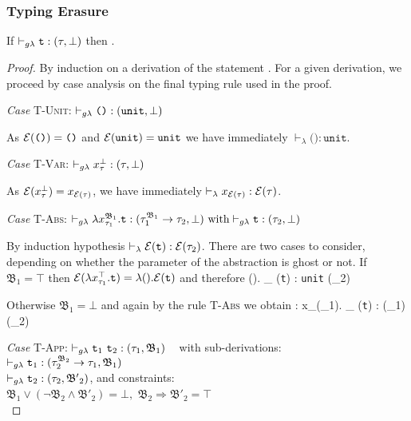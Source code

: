 \subsubsection{Typing Erasure}
\begin{lemma}
	If  $\vdash_{g\lambda} \texttt{t} : (\tau, \bot)$  
	then .
\end{lemma}
\begin{proof}
By induction on a derivation of the statement 
. 
For a given derivation, we proceed by case analysis on the final typing rule
 used in the proof. 
 
 	\noindent\textit{Case} \textsc{T-Unit}:\quad 
 	$\vdash_{g\lambda} \texttt{()} : (\texttt{unit}, \bot)$ 
 	
 		As  $\mathcal{E}(\texttt{()}) = \texttt{()}$ and $ \mathcal{E}(\texttt{unit}) = \texttt{unit}$
 		 we have immediately $\vdash_{\lambda} \texttt{()} : \texttt{unit}$.
 	
 	\noindent\textit{Case} \textsc{T-Var}:\quad 
 	$\vdash_{g\lambda} x_{\tau}^{\bot} : (\tau, \bot)$
 	 
 	 As  $\mathcal{E}(x_{\tau}^{\bot}) = x_{\mathcal{E}(\tau)}$, we have immediately 
 	 $\vdash_{\lambda} x_{\mathcal{E}(\tau)} : \mathcal{E}(\tau)$.
 	 

 	\textit{Case} \textsc{T-Abs}:\quad
 		$\vdash_{g\lambda} \lambda x_{\tau_{1}}^{\mathfrak{B}_{1}}.\texttt{t} : (\tau_{1}^{\mathfrak{B}_{1}} \rightarrow 
 		\tau_{2}, \bot)~ \text{with} \vdash_{g\lambda} \texttt{t} : (\tau_{2}, \bot)	$
 		
 		By induction hypothesis $\vdash_{\lambda} \mathcal{E}(\texttt{t}) : \mathcal{E}(\tau_{2}) $.
 		There are two cases to consider, depending on whether the parameter 
 		of the abstraction is ghost or not. If $\mathfrak{B_{1} = \top}$ then 
 		$\mathcal{E}(\lambda x_{\tau_{1}}^{\top}. \texttt{t}) = \lambda (). \mathcal{E}(\texttt{t})$
 		and therefore
 		{\lambda (). \vdash_{\lambda} \e(\texttt{t}) : 
 		\texttt{unit} \rightarrow 	\e(\tau_{2})} 
 	
 		Otherwise $\mathfrak{B_{1} = \bot}$ and again by the rule \textsc{T-Abs} 
 		we obtain :
 		{\lambda x_{\e(\tau_{1})}. \vdash_{\lambda} \e(\texttt{t}) : 
 		\e(\tau_{1}) \rightarrow 	\e(\tau_{2})}
 		
 		 	
 	\textit{Case} \textsc{T-App}:\quad
 	$\vdash_{g\lambda} \texttt{t}_{1}~\texttt{t}_{2} : (\tau_{1}, \mathfrak{B}_{1}) $ ~
 	with sub-derivations: \\
	$\vdash_{g\lambda} \texttt{t}_{1} : (\tau_{2}^{\mathfrak{B}_{2}} \rightarrow \tau_{1}, \mathfrak{B}_{1})$ \\
	$ \vdash_{g\lambda} \texttt{t}_{2} : (\tau_{2}, \mathfrak{B'}_{2}) $, \quad 
	and constraints: \\ 
	$ \mathfrak{B}_{1}\vee (\neg \mathfrak{B}_{2} \wedge \mathfrak{B'}_{2})=\bot,$
	$ \mathfrak{B}_{2} \Rightarrow \mathfrak{B'}_{2} = \top $ \\
	

\end{proof}
